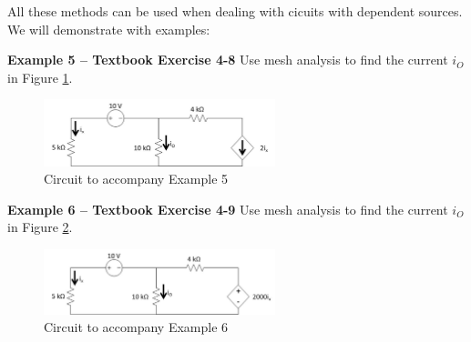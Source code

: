 \documentclass{handout}
\begin{document}
All these methods can be used when dealing with cicuits with dependent sources.  We will demonstrate with examples:

\newpage
\clearpage
\pagebreak

\textbf{Example 5 -- Textbook Exercise 4-8}
Use mesh analysis to find the current $i_O$ in Figure \ref{fig: Example5}.
\begin{figure}[h! t! b!]
\centering
\includegraphics[width=0.6\textwidth]{Example5.jpg}
\caption{Circuit to accompany Example 5}
\label{fig: Example5}
\end{figure}


\newpage
\clearpage
\pagebreak

\textbf{Example 6 -- Textbook Exercise 4-9}
Use mesh analysis to find the current $i_O$ in Figure \ref{fig: Example6}.
\begin{figure}[h! t! b!]
\centering
\includegraphics[width=0.6\textwidth]{Example6.jpg}
\caption{Circuit to accompany Example 6}
\label{fig: Example6}
\end{figure}
\end{document}
